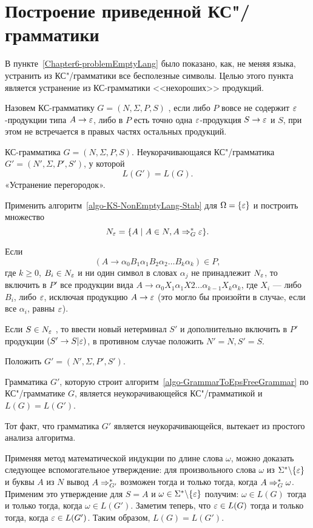 \section{Построение приведенной КС"/грамматики}
\label{Chapter6-normalizeGrammar}

В пункте~\ref{Chapter6-problemEmptyLang} было показано, как, не меняя языка, устранить из КС"/грамматики все бесполезные символы. Целью этого пункта является устранение из КС-грамматики <<нехороших>> продукций.

Назовем КС-грамматику $G=(N,\Sigma,P,S)$ , если либо $P$ вовсе не содержит $\varepsilon$-продукции типа $A\to\varepsilon$, либо в $P$ есть точно одна $\varepsilon$-продукция $S\to\varepsilon$ и $S$, при этом не встречается в правых частях остальных продукций.

{\label{algo-GrammarToEpsFreeGrammar}КС-грамматика $G=(N,\Sigma,P,S)$.}
{Неукорачивающаяся КС"/грамматика $G'=(N',\Sigma,P',S')$, у которой \[L(G')=L(G).\]}
{«Устранение перегородок».}
{
\item Применить алгоритм~\ref{algo-KS-NonEmptyLang-Stab} для $\Omega=\{\varepsilon\}$ и построить множество
\[
    N_\varepsilon=\{A\mid A\in N, A\Rightarrow_G^*\varepsilon\}.
\]

\item Если
\[
    (A\to\alpha_0B_1\alpha_1B_2\alpha_2 \ldots B_k\alpha_k)\in P,
\]
где $k\ge 0$, $B_i\in N_\varepsilon$ и ни один символ в словах $\alpha_j$ не принадлежит $N_\varepsilon$, то включить в $P'$ все продукции вида $A\to\alpha_0X_1\alpha_1X2 \ldots \alpha_{k-1}X_k\alpha_k$, где $X_i$ --- либо $B_i$, либо $\varepsilon$, исключая продукцию $A\to\varepsilon$ (это могло бы произойти в случаe, если все $\alpha_i$, равны $\varepsilon$).

\item Если $S\in N_\varepsilon$ , то ввести новый нетерминал $S'$ и дополнительно включить в $P'$ продукции $(S'\to S|\varepsilon)$, в противном случае положить $N'=N, S'=S$.

\item Положить $G'=(N',\Sigma,P',S')$.
}

\begin{mytheorem}
\label{theorem-AlgoDelEpsProductionsCorrectness}
Грамматика $G'$, которую строит алгоритм~\ref{algo-GrammarToEpsFreeGrammar} по КС"/грамматике $G$, является неукорачивающейся КС"/грамматикой и $L(G)=L(G')$.
\end{mytheorem}

\begin{myproof}
Тот факт, что грамматика $G'$ является неукорачивающейся, вытекает из простого анализа алгоритма.

Применяя метод математической индукции по длине слова $\omega$, можно доказать следующее вспомогательное утверждение: для произвольного слова $\omega$ из $\Sigma^*\backslash\{\varepsilon\}$ и буквы $A$ из $N$ вывод $A\Rightarrow_{G'}^*$ возможен тогда и только тогда, когда $A\Rightarrow_G^*\omega$. Применим это утверждение для $S=A$ и $\omega\in\Sigma^*\backslash\{\varepsilon\}$ получим: $\omega\in L(G)$ тогда и только тогда, когда $\omega\in L(G')$. Заметим теперь, что $\varepsilon\in L(G)$ тогда и только тогда, когда $\varepsilon\in L(G')$. Таким образом, $L(G)=L(G')$.
\end{myproof}

